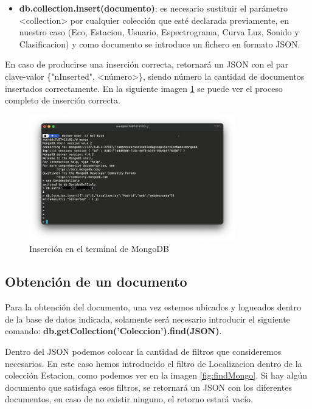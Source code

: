 \begin{itemize}
    \item \textbf{db.collection.insert(documento)}: es necesario sustituir el parámetro <collection> por cualquier colección que esté declarada previamente, en nuestro caso (Eco, Estacion, Usuario, Espectrograma, Curva Luz, Sonido y Clasificacion) y como documento se introduce un fichero en formato JSON.
\end{itemize}

En caso de producirse una inserción correcta, retornará un JSON con el par clave-valor \{"nInserted", <número>\}, siendo número la cantidad de documentos insertados correctamente. En la siguiente imagen \ref{fig:insertMongo} se puede ver el proceso completo de inserción correcta.

\begin{figure}[h]
    \centering
    \includegraphics[width=0.8\textwidth]{include/resultados/InsertMongo.png}
    \caption{Inserción en el terminal de MongoDB}
    \label{fig:insertMongo}
\end{figure}

\subsection{Obtención de un documento}

Para la obtención del documento, una vez estemos ubicados y logueados dentro de la base de datos indicada, solamente será necesario introducir el siguiente comando: \textbf{db.getCollection('Coleccion').find(JSON)}.

Dentro del JSON podemos colocar la cantidad de filtros que consideremos necesarios. En este caso hemos introducido el filtro de Localizacion dentro de la colección Estacion, como podemos ver en la imagen \ref{fig:findMongo}. Si hay algún documento que satisfaga esos filtros, se retornará un JSON con los diferentes documentos, en caso de no existir ninguno, el retorno estará vacío.

